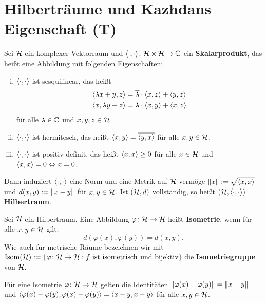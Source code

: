 \section{Hilberträume und Kazhdans Eigenschaft (T)}
\label{sec:prT}

\begin{definition}[Hilbertraum]
	Sei $\mathcal{H}$ ein komplexer Vektorraum und $\langle\cdot,\cdot\rangle\colon \mathcal{H} \times \mathcal{H} \rightarrow \mathbb{C}$ ein \textbf{Skalarprodukt}, das heißt eine Abbildung mit folgenden Eigenschaften:
	\begin{enumerate}[(i)]
		\item $\langle\cdot,\cdot\rangle$ ist sesquilinear, das heißt
		\begin{equation}
		\begin{aligned}
			\langle\lambda x + y,z\rangle &= \overline{\lambda} \cdot \langle x,z\rangle + \langle y,z\rangle \\
			\langle x,\lambda y + z\rangle &= \lambda \cdot \langle x,y\rangle + \langle x,z\rangle
		\end{aligned}
		\end{equation}
		für alle $\lambda \in \mathbb{C}$ und $x,y,z \in \mathcal{H}$.
		\item $\langle\cdot,\cdot\rangle$ ist hermitesch, das heißt $\langle x,y\rangle = \overline{\langle y,x\rangle}$	für alle $x,y \in \mathcal{H}$.
		\item $\langle\cdot,\cdot\rangle$ ist positiv definit, das heißt $\langle x,x\rangle \geq 0$ für alle $x \in \mathcal{H}$ und $\langle x,x\rangle = 0 \Leftrightarrow x = 0$.
	\end{enumerate}
	Dann induziert $\langle\cdot,\cdot\rangle$ eine Norm und eine Metrik auf $\mathcal{H}$ vermöge $\lVert x\rVert := \sqrt{\langle x,x\rangle}$ und $d(x,y) := \lVert x-y\rVert$ für $x,y \in \mathcal{H}$. Ist $(\mathcal{H},d)$ vollständig, so heißt $(\mathcal{H},\langle\cdot,\cdot\rangle)$ \textbf{Hilbertraum}.
\end{definition}

\begin{definition}[Isometrie]
	\label{def_isometrie}
	Sei $\mathcal{H}$ ein Hilbertraum. Eine Abbildung $\varphi\colon \mathcal{H} \rightarrow \mathcal{H}$ heißt \textbf{Isometrie}, wenn für alle $x,y \in \mathcal{H}$ gilt:
	\[ d(\varphi(x),\varphi(y)) = d(x,y). \]
	Wie auch für metrische Räume bezeichnen wir mit $\operatorname{Isom}(\mathcal{H}) := \{\varphi \colon \mathcal{H} \rightarrow \mathcal{H} : f \text{ ist isometrisch}$ $\text{und bijektiv}\}$ die \textbf{Isometriegruppe} von $\mathcal{H}$.
\end{definition}	
	
\begin{bemerkung}
	Für eine Isometrie $\varphi \colon \mathcal{H} \rightarrow \mathcal{H}$ gelten die Identitäten $\lVert\varphi(x)-\varphi(y)\rVert = \lVert x-y\rVert$ und $\langle\varphi(x)-\varphi(y),\varphi(x)-\varphi(y)\rangle=\langle x-y,x-y\rangle$ für alle $x,y \in \mathcal{H}$.
\end{bemerkung}	

